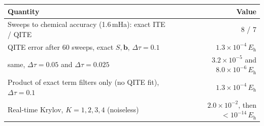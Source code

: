 \documentclass[11pt,a4paper]{article}
\newcommand{\dt}{\Delta\tau}
\newcommand{\Eh}{E_{\mathrm h}}
\begin{document}
\begin{center}
\small
\begin{tabularx}{\linewidth}{@{}Xr@{}}
\toprule
Quantity & Value\\\midrule
Sweeps to chemical accuracy (1.6\,mHa): exact ITE / QITE & 8 / 7\\
QITE error after 60 sweeps, exact $S,\bm b$, $\dt=0.1$ & $1.3\times10^{-4}\,\Eh$\\
\quad same, $\dt=0.05$ \; and \; $\dt=0.025$ & $3.2\times10^{-5}$ \; and \; $8.0\times10^{-6}\,\Eh$\\
Product of exact term filters only (no QITE fit), $\dt=0.1$ & $1.3\times10^{-4}\,\Eh$\\
Real-time Krylov, $K=1,2,3,4$ (noiseless) & $2.0\times10^{-2}$, then $<10^{-14}\,\Eh$\\\bottomrule
\end{tabularx}
\end{center}
\end{document}

